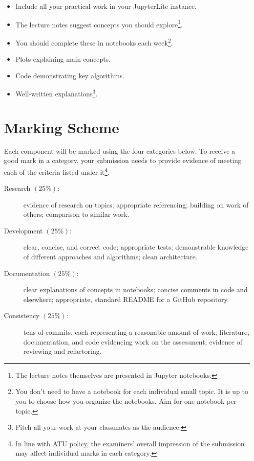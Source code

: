 \documentclass[a4paper]{tufte-handout}
\begin{document}
\begin{itemize}
  \item Include all your practical work in your JupyterLite instance.
  \item The lecture notes suggest concepts you should explore\footnote{The lecture notes themselves are presented in Jupyter notebooks.}.
  \item You should complete these in notebooks each week\footnote{You don't need to have a notebook for each individual small topic. It is up to you to choose how you organize the notebooks. Aim for one notebook per topic.}.
  \item Plots explaining main concepts.
  \item Code demonstrating key algorithms.
  \item Well-written explanations\footnote{Pitch all your work at your classmates as the audience.}.
\end{itemize} 


\section{Marking Scheme}
Each component will be marked using the four categories below.
To receive a good mark in a category, your submission needs to provide evidence of meeting each of the criteria listed under it\footnote{In line with ATU policy, the examiners' overall impression of the submission may affect individual marks in each category.}.

\begin{description}
  \item[Research $(25\%)$:] evidence of research on topics; appropriate referencing; building on work of others; comparison to similar work.
  \item[Development $(25\%)$:] clear, concise, and correct code; appropriate tests; demonstrable knowledge of different approaches and algorithms; clean architecture.
  \item[Documentation $(25\%)$:] clear explanations of concepts in notebooks; concise comments in code and elsewhere; appropriate, standard README for a GitHub repository.
  \item[Consistency $(25\%)$:] tens of commits, each representing a reasonable amount of work; literature, documentation, and code evidencing work on the assessment; evidence of reviewing and refactoring.
\end{description}
\end{document}
